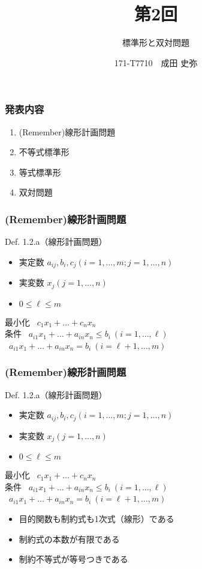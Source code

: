 \documentclass[unicode, 12pt, aspectratio = 43]{beamer}
\title{第2回}
\subtitle{標準形と双対問題} %
\author{171-T7710　成田 史弥}
\institute{工学部　数理工学科　城本研究室}
\date{} %
\begin{document}
\begin{frame}
	\titlepage
\end{frame}

\begin{frame}[fragile]
	\frametitle{発表内容}
	\begin{enumerate}
		\item (Remember)線形計画問題 %
		\item 不等式標準形
		\item 等式標準形
		\item 双対問題
	\end{enumerate}
\end{frame}

\begin{frame}[fragile]
	\frametitle{(Remember)線形計画問題}
	\begin{itembox}[l]{Def. 1.2.a（線形計画問題）}
		\begin{itemize}
			\item 実定数 $a_{ij}, b_{i}, c_{j}(i = 1, \dots, m; j = 1, \dots, n)$
			\item 実変数 $x_{j}(j = 1, \dots, n)$
			\item $0 \le \ell \le m$
		\end{itemize}
		最小化 \ $c_1x_1+ \dots+ c_nx_n$ \\
		条件 \ $a_{i1}x_1 + \dots+ a_{in}x_n \le b_i \ (i = 1, \dots, \ell)$ \\
		\   $a_{i1}x_1 + \dots+ a_{in}x_n = b_i \ (i = \ell+1, \dots, m)$
	\end{itembox}
\end{frame}

\begin{frame}[fragile]
	\frametitle{(Remember)線形計画問題}
	\begin{itembox}[l]{Def. 1.2.a（線形計画問題）}
		\begin{itemize}
			\item 実定数 $a_{ij}, b_i, c_j(i = 1, \dots, m; j = 1, \dots, n)$
			\item 実変数 $x_j(j = 1, \dots, n)$
			\item $0 \le \ell \le m$
		\end{itemize}
		最小化 \ $c_1x_1+ \dots+ c_nx_n$ \\
		条件 \ $a_{i1}x_1 + \dots+ a_{in}x_n \le b_i \ (i = 1, \dots, \ell)$ \\
		\   $a_{i1}x_1 + \dots+ a_{in}x_n = b_i \ (i = \ell+1, \dots, m)$
	\end{itembox}
	\begin{itemize}
		\item 目的関数も制約式も1次式（線形）である
		\item 制約式の本数が有限である
		\item 制約不等式が等号つきである
	\end{itemize}
\end{frame}
\end{document}
